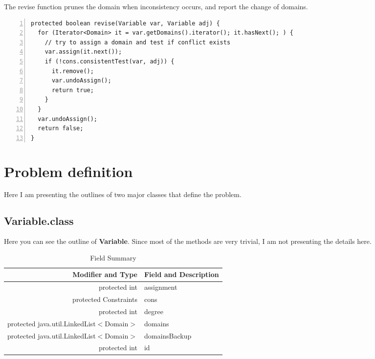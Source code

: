 \documentclass{article}
\begin{document}
The revise function prunes the domain when inconsistency occurs, and report the change of domains.

\begin{lstlisting}[numbers=left, caption=CSPsolver.class]   
protected boolean revise(Variable var, Variable adj) {
  for (Iterator<Domain> it = var.getDomains().iterator(); it.hasNext(); ) {
    // try to assign a domain and test if conflict exists
    var.assign(it.next());
    if (!cons.consistentTest(var, adj)) {
      it.remove();
      var.undoAssign();
      return true;
    }
  }
  var.undoAssign();
  return false;
}
\end{lstlisting}














\clearpage
\section{Problem definition}
Here I am presenting the outlines of two major classes that define the problem.

\subsection{Variable.class}

Here you can see the outline of \textbf{Variable}. Since most of the methods are very trivial, I am not presenting the details here.



\begin{table}[h]
\begin{center}
  \begin{tabular}{ |r | l | }
    \hline
    Modifier and Type & Field and Description \\ \hline
    protected int &	assignment                          \\ \hline
protected Constraints &	cons                            \\ \hline
protected int &	degree                                  \\ \hline
protected java.util.LinkedList$<$Domain$>$ &	domains       \\ \hline
protected java.util.LinkedList$<$Domain$>$ &	domainsBackup \\ \hline
protected int &	id \\ \hline

  \end{tabular}
\caption{Field Summary}
\end{center}
\end{table}
\end{document}

